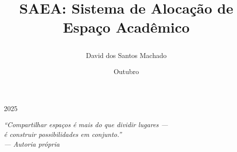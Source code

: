 \documentclass{projetofinal}
\begin{document}

\title{ \begin{center} SAEA: Sistema de Alocação de Espaço Acadêmico \end{center} } 

\author{David dos Santos Machado}{}




\date{Outubro}{2025}%
\maketitle %



\startdocument%





\begin{epigrafe}
    \vspace*{\fill}
    \begin{flushright}
        \textit{
            “Compartilhar espaços é mais do que dividir lugares —\\
            é construir possibilidades em conjunto.”\\[0.5cm]
            — Autoria própria
        }
    \end{flushright}
    \pagebreak
\end{epigrafe}
\end{document}
